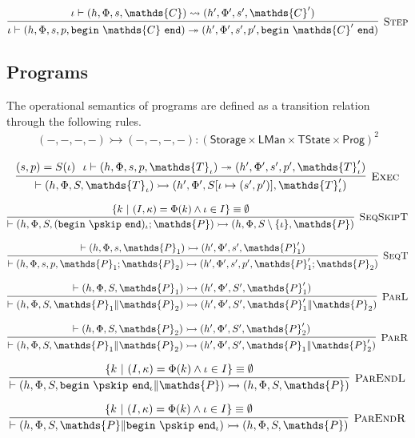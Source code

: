 \[
\infer[\textsc{Step}]
{
	\iota \vdash (h, \Phi, s, p, \mathtt{begin}\ \mathds{C}\ \mathtt{end})
	\twoheadrightarrow
	(h', \Phi', s', p', \mathtt{begin}\ \mathds{C}'\ \mathtt{end})
}
{
	\iota \vdash (h, \Phi, s, \mathds{C})
	\rightsquigarrow
	(h', \Phi', s', \mathds{C}')
}
\]

\subsection{Programs}


The operational semantics of programs are defined as a transition relation through the following rules.
\begin{gather*}
(-, -, -, -) \rightarrowtail (-, -, -, -) 
: (\mathsf{Storage} \times \mathsf{LMan} \times \mathsf{TState} \times \mathsf{Prog})^2
\end{gather*}

\[
\infer[\textsc{Exec}]
{
	\vdash (h, \Phi, S, \mathds{T}_\iota)
	\rightarrowtail
	(h', \Phi', S[\iota \mapsto (s', p')], \mathds{T}_\iota')
}
{
	(s, p) = S(\iota)\ \
	\iota \vdash (h, \Phi, s, p, \mathds{T}_\iota)
	\twoheadrightarrow
	(h', \Phi', s', p', \mathds{T}_\iota')
}
\]

\[
\infer[\textsc{SeqSkipT}]
{
	\vdash (h, \Phi, S, (\mathtt{begin}\ \pskip\ \mathtt{end})_\iota; \mathds{P})
	\rightarrowtail
	(h, \Phi, S \setminus \{\iota\}, \mathds{P})
}
{
	\{ k\ |\ (I, \kappa) = \Phi(k) \land \iota \in I \} \equiv \emptyset
}
\]

\[
\infer[\textsc{SeqT}]
{
	\vdash (h, \Phi, s, p, \mathds{P}_1; \mathds{P}_2)
	\rightarrowtail
	(h', \Phi', s', p', \mathds{P}_1'; \mathds{P}_2)
}
{
	\vdash (h, \Phi, s, \mathds{P}_1)
	\rightarrowtail
	(h', \Phi', s', \mathds{P}_1')
}
\]

\[
\infer[\textsc{ParL}]
{
	\vdash (h, \Phi, S, \mathds{P}_1 \| \mathds{P}_2)
	\rightarrowtail
	(h', \Phi', S', \mathds{P}_1' \| \mathds{P}_2)
}
{
	\vdash (h, \Phi, S, \mathds{P}_1)
	\rightarrowtail
	(h', \Phi', S', \mathds{P}_1')
}
\]

\[
\infer[\textsc{ParR}]
{
	\vdash (h, \Phi, S, \mathds{P}_1 \| \mathds{P}_2)
	\rightarrowtail
	(h', \Phi', S', \mathds{P}_1 \| \mathds{P}_2')
}
{
	\vdash (h, \Phi, S, \mathds{P}_2)
	\rightarrowtail
	(h', \Phi', S', \mathds{P}_2')
}
\]

\[
\infer[\textsc{ParEndL}]
{
	\vdash (h, \Phi, S, \mathtt{begin}\ \pskip\ \mathtt{end}_\iota \| \mathds{P})
	\rightarrowtail
	(h, \Phi, S, \mathds{P})
}
{
	\{ k\ |\ (I, \kappa) = \Phi(k) \land \iota \in I \} \equiv \emptyset
}
\]

\[
\infer[\textsc{ParEndR}]
{
	\vdash (h, \Phi, S, \mathds{P} \| \mathtt{begin}\ \pskip\ \mathtt{end}_\iota)
	\rightarrowtail
	(h, \Phi, S, \mathds{P})
}
{
	\{ k\ |\ (I, \kappa) = \Phi(k) \land \iota \in I \} \equiv \emptyset
}
\]
